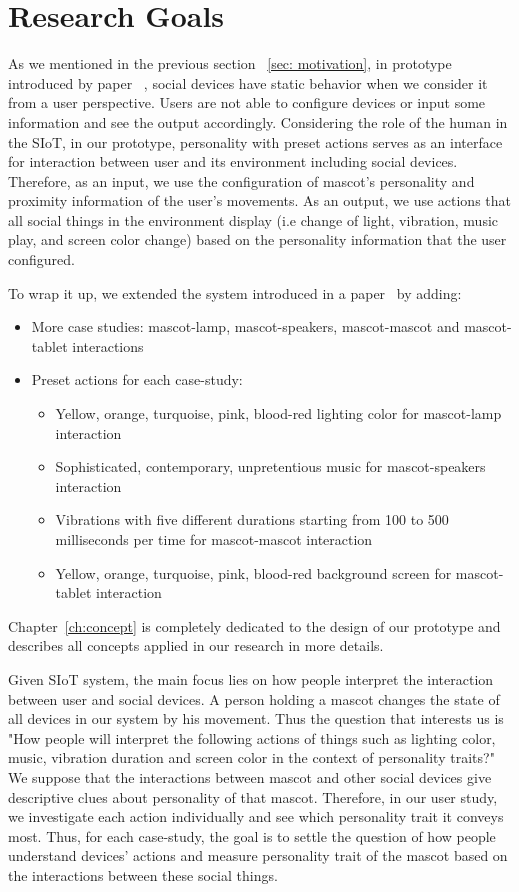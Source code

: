 \section{Research Goals}
\label{sec:research-goals}
As we mentioned in the previous section ~\ref{sec: motivation}, in prototype introduced
by paper ~\cite{okada2016autonomous}, social devices have static behavior when we consider it from a user perspective.
Users are not able to configure devices or input some information and see the output accordingly.
Considering the role of the human in the SIoT, in our prototype, personality with preset
actions serves as an interface for interaction between user and its environment including social devices.
Therefore, as an input, we use the configuration of mascot's personality and proximity
information of the user's movements.
As an output, we use actions that all social things in the environment display
(i.e change of light, vibration, music play, and screen color change) based
on the personality information that the user configured.

To wrap it up, we extended the system introduced in a paper~\cite{okada2016autonomous} by adding:
\begin{itemize}
    \item More case studies: mascot-lamp, mascot-speakers, mascot-mascot and mascot-tablet interactions
    \item Preset actions for each case-study:
    \begin{itemize}
        \item Yellow, orange, turquoise, pink, blood-red lighting color for mascot-lamp interaction
        \item Sophisticated, contemporary, unpretentious music for mascot-speakers interaction
        \item Vibrations with five different durations starting from 100 to
        500 milliseconds per time for mascot-mascot interaction
        \item Yellow, orange, turquoise, pink, blood-red background screen for mascot-tablet interaction
    \end{itemize}
\end{itemize}
Chapter~\ref{ch:concept} is completely dedicated to the design of our prototype and
describes all concepts applied in our research in more details.

Given SIoT system, the main focus lies on how people interpret the interaction between user and social devices.
A person holding a mascot changes the state of all devices in our system by his movement.
Thus the question that interests us is "How people will interpret the following actions of things such as
lighting color, music, vibration duration and screen color in the context of personality traits?"
We suppose that the interactions between mascot and other social
devices give descriptive clues about personality of that mascot.
Therefore, in our user study, we investigate each action individually and see which personality trait it conveys most.
Thus, for each case-study, the goal is to settle the question of how people understand devices' actions
and measure personality trait of the mascot based on the interactions between these social things.

